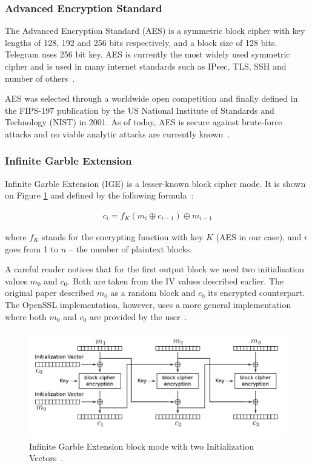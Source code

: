 \documentclass[thesis=M,english]{FITthesis}[2012/10/20]
\begin{document}
\subsubsection{Advanced Encryption Standard}

The Advanced Encryption Standard (AES) is a symmetric block cipher with key lengths of 128, 192 and 256 bits respectively, and a block size of 128 bits. Telegram uses 256 bit key. AES is currently the most widely used symmetric cipher and is used in many internet standards such as IPsec, TLS, SSH and number of others~\cite{understanding-crypto}.

AES was selected through a worldwide open competition and finally defined in the FIPS-197 publication by the US National Institute of Standards and Technology (NIST) in 2001. As of today, AES is secure against brute-force attacks and no viable analytic attacks are currently known~\cite{understanding-crypto}.

\subsubsection{Infinite Garble Extension}

\addtocounter{footnote}{1}\addtocounter{Hfootnote}{1}

Infinite Garble Extension (IGE) is a lesser-known block cipher mode. It is shown on Figure \ref{img:crypto-regular-ige-enc} and defined by the following formula~\cite{telegram-openssl-ige}:

\begin{gather*}
c_i = f_K(m_i \oplus c_{i-1}) \oplus m_{i-1}
\end{gather*}

where $f_K$ stands for the encrypting function with key $K$ (AES in our case), and $i$ goes from 1 to $n$ -- the number of plaintext blocks.

A careful reader notices that for the first output block we need two initialisation values $m_0$ and $c_0$. Both are taken from the IV values described earlier. The original paper described $m_0$ as a random block and $c_0$ its encrypted counterpart. The OpenSSL implementation, however, uses a more general implementation where both $m_0$ and $c_0$ are provided by the user~\cite{telegram-openssl-ige}.

\begin{figure}[htb]
	\centering
	\includegraphics[width=1\textwidth]{ige-enc.pdf}
	\caption[IGE block cipher mode]{Infinite Garble Extension block mode with two Initialization Vectors~\cite{telegram-aarhus}.}
	\label{img:crypto-regular-ige-enc}
\end{figure}
\end{document}
